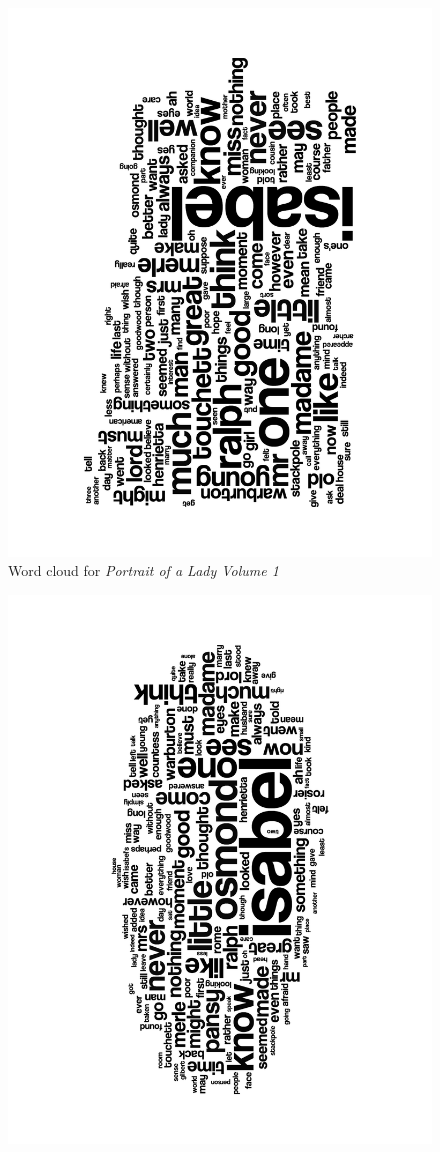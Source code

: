\documentclass[a4paper,11pt,oneside]{book}
\begin{document}
\begin{enumerate}
\begin{figure}[htb]
\begin{center}
					\includegraphics[angle=270,width=0.8\columnwidth]{resources/wordclouds/PortraitOfALady1_WordCloud.pdf}%
					\end{center}
					\caption{Word cloud for \emph{Portrait of a Lady Volume 1}}%
					\label{wcLadyOne}%
				\end{figure}
				\begin{figure}[htb] 
					\begin{center}
					\includegraphics[angle=270,width=0.8\columnwidth]{resources/wordclouds/PortraitOfALady2_WordCloud.pdf}%

\end{center}
\end{figure}
\end{enumerate}
\end{document}

